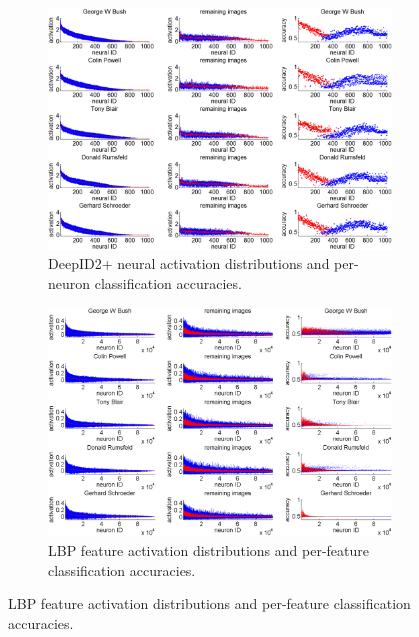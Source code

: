\documentclass[10pt,twocolumn,letterpaper]{article}
\begin{document}
\begin{figure}[tb!]

\begin{subfigure}{1.0\linewidth}
\includegraphics[width = 1.0\linewidth]{picture/1.png}
\vspace{-0.2in}
\caption{DeepID2+ neural activation distributions and per-neuron classification accuracies.}
\label{fig:actcnn}
\vspace{0.05in}
\end{subfigure}

\begin{subfigure}{1.0\linewidth}
\includegraphics[width = 1.0\linewidth]{picture/2.png}
\vspace{-0.2in}
\caption{LBP feature activation distributions and per-feature classification accuracies.}
\label{fig:actlbp}
\vspace{0.0in}
\end{subfigure}


\end{figure}
\end{document}

